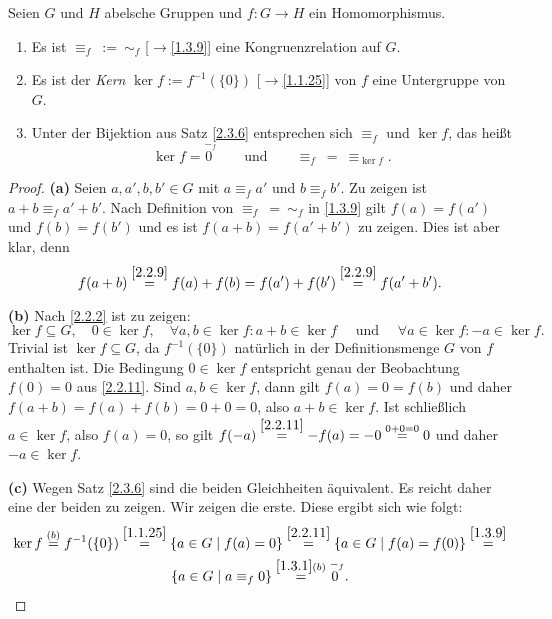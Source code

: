 \documentclass[../../main.tex]{subfiles}
\begin{document}
\begin{defprop}\label{2.3.10}
Seien $G$ und $H$ abelsche Gruppen und $f\colon G\to H$ ein Homomorphismus.
\begin{enumerate}[\normalfont(a)]
\item Es ist $\equiv_f~:=~\sim_f$ [$\to$\ref{1.3.9}] eine Kongruenzrelation auf $G$.
\item Es ist der \emph{Kern} $\ker f:=f^{-1}(\{0\})$ [$\to$\ref{1.1.25}] von $f$ eine Untergruppe von $G$.
\item Unter der Bijektion aus Satz \ref{2.3.6} entsprechen sich $\equiv_f$ und $\ker f$, das heißt
$$\ker f=\overset{-_f}{0~}\qquad\text{und}\qquad\equiv_f~=~\equiv_{\ker f}.$$
\end{enumerate}
\end{defprop}
\begin{proof}
{\bf (a)} Seien $a,a',b,b'\in G$ mit $a\equiv_f a'$ und $b\equiv_f b'$. Zu zeigen ist $a+b\equiv_f a'+b'$. Nach Definition von $\equiv_f~=~\sim_f$ in \ref{1.3.9} gilt
$f(a)=f(a')$ und $f(b)=f(b')$ und es ist $f(a+b)=f(a'+b')$ zu zeigen. Dies ist aber klar, denn
$$f(a+b)\overset{\ref{2.2.9}}=f(a)+f(b)=f(a')+f(b')\overset{\ref{2.2.9}}=f(a'+b').$$

\smallskip\noindent
{\bf (b)} Nach \ref{2.2.2} ist zu zeigen:
$$\ker f\subseteq G,\quad 0\in\ker f,\quad \forall a,b\in\ker f:a+b\in\ker f\quad\text{ und }\quad\forall a\in\ker f:-a\in\ker f.$$
Trivial ist $\ker f\subseteq G$, da $f^{-1}(\{0\})$ natürlich in der Definitionsmenge $G$ von $f$ enthalten ist. Die Bedingung $0\in\ker f$ entspricht genau der Beobachtung $f(0)=0$ aus \ref{2.2.11}. Sind $a,b\in\ker f$, dann
gilt $f(a)=0=f(b)$ und daher $f(a+b)=f(a)+f(b)=0+0=0$, also $a+b\in\ker f$. Ist schließlich $a\in\ker f$, also $f(a)=0$, so gilt $f(-a)\overset{\ref{2.2.11}}=-f(a)=-0\overset{0+0=0}=0$ und
daher $-a\in\ker f$.

\smallskip\noindent
{\bf (c)} Wegen Satz \ref{2.3.6} sind die beiden Gleichheiten äquivalent. Es reicht daher eine der beiden zu zeigen. Wir zeigen die erste. Diese ergibt sich wie folgt:
\begin{multline*}
\ker f\overset{(b)}=f^{-1}(\{0\})\overset{\ref{1.1.25}}=\{a\in G\mid f(a)=0\}\overset{\ref{2.2.11}}=\{a\in G\mid f(a)=f(0)\}\overset{\ref{1.3.9}}=\\\{a\in G\mid a\equiv_f0\}\overset{\ref{1.3.1}(b)}=
\overset{-_f}{0~}.
\end{multline*}
\end{proof}
\end{document}
